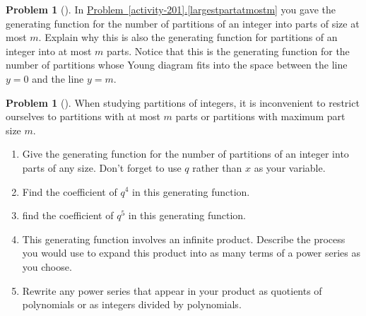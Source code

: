 \documentclass[10pt,]{book}
\theoremstyle{plain}
\theoremstyle{definition}
\newtheorem{activity}[project]{Problem}
\theoremstyle{definition}
\numberwithin{equation}{chapter}
\begin{document}
\begin{activity}[] \label{atmostmparts}
In \hyperref[largestpartatmostm]{Problem~\ref{activity-201}.\ref{largestpartatmostm}} you gave the generating function for the number of partitions of an integer into parts of size at most \(m\). Explain why this is also the generating function for partitions of an integer into at most \(m\) parts. Notice that this is the generating function for the number of partitions whose Young diagram fits into the space between the line \(y=0\) and the line \(y=m\).%
\end{activity}
\begin{activity}[] \label{genfunpartitions}
When studying partitions of integers, it is inconvenient to restrict ourselves to partitions with at most \(m\) parts or partitions with maximum part size \(m\).%
\begin{enumerate}[font=\bfseries,label=(\alph*),ref=\alph*]
\item\label{task-141} \marginsymbol[-2.5em]{} Give the generating function for the number of partitions of an integer into parts of any size. Don't forget to use \(q\) rather than \(x\) as your variable.%
\item\label{task-142} \marginsymbol[-2.5em]{} Find the coefficient of \(q^4\) in this generating function.%
\item\label{task-143} \marginsymbol[-2.5em]{} find the coefficient of \(q^5\) in this generating function.%
\item\label{task-144} \marginsymbol[-2.5em]{} This generating function involves an infinite product. Describe the process you would use to expand this product into as many terms of a power series as you choose.%
\item\label{task-145} \marginsymbol[-2.5em]{} Rewrite any power series that appear in your product as quotients of polynomials or as integers divided by polynomials.%
\end{enumerate}
\end{activity}
\end{document}

